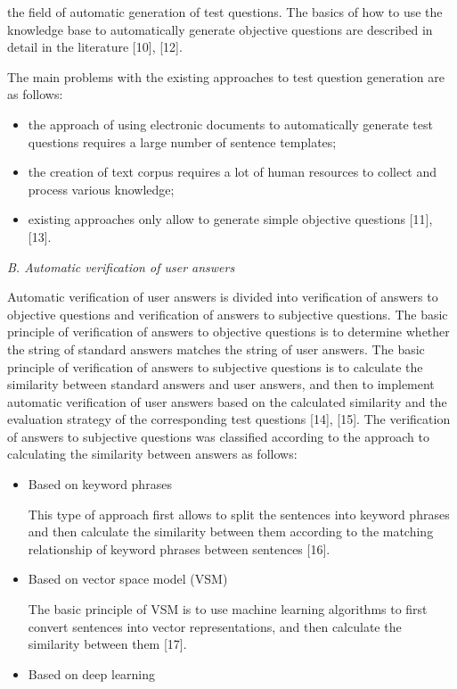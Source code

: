 \documentclass{article}
\begin{document}
\begin{multicols}{2}
\noindent the field of automatic generation of test questions. The
basics of how to use the knowledge base to automatically
generate objective questions are described in detail in the
literature [10], [12].

The main problems with the existing approaches to
test question generation are as follows:
    \begin{itemize}
        \item the approach of using electronic documents to automatically generate test questions requires a large number of sentence templates;
        \item the creation of text corpus requires a lot of human resources to collect and process various knowledge;
        \item existing approaches only allow to generate simple objective questions [11], [13].
    \end{itemize}

\textit{B. Automatic verification of user answers}

Automatic verification of user answers is divided into verification of answers to objective questions and verification of answers to subjective questions. The basic principle of verification of answers to objective questions is to determine whether the string of standard answers matches the string of user answers. The basic principle of verification of answers to subjective questions is to calculate the similarity between standard answers and user answers, and then to implement automatic verification of user answers based on the calculated similarity and the evaluation strategy of the corresponding test questions [14], [15]. The verification of answers to subjective questions was classified according to the approach to calculating the similarity between answers as follows:
    \begin{itemize}
        \item Based on keyword phrases
    
        This type of approach first allows to split the sentences into keyword phrases and then calculate the similarity between them according to the matching relationship of keyword phrases between sentences [16].
        \item Based on vector space model (VSM)
    
        The basic principle of VSM is to use machine learning algorithms to first convert sentences into vector representations, and then calculate the similarity between them [17].
        \item Based on deep learning 
    

\end{itemize}
\end{multicols}
\end{document}
